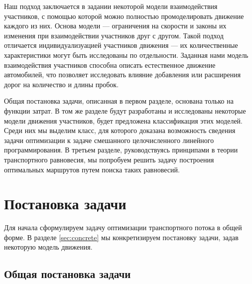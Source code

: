 \documentclass[12pt, a4paper]{article}
\begin{document}
Наш подход заключается в задании некоторой модели взаимодействия участников, с помощью которой можно полностью промоделировать движение каждого из них. Основа модели --- ограничения на скорости и законы их изменения при взаимодействии участников друг с другом. Такой подход отличается индивидуализуацией участников движения --- их количественные характеристики могут быть исследованы по отдельности. Заданная нами модель взаимодействия участников способна описать естественное движение автомобилей, что позволяет исследовать влияние добавления или расширения дорог на количество и длины пробок.

Общая постановка задачи, описанная в первом разделе, основана только на функции затрат.
В том же разделе будут разработаны и исследованы некоторые модели движения участников, будет предложена классификация этих моделей. Среди них мы выделим класс, для которого доказана возможность сведения задачи оптимизации к задаче смешанного целочисленного линейного программирования. В третьем разделе, руководствуясь принципами в теории транспортного равновесия, мы попробуем решить задачу построения оптимальных маршрутов путем поиска таких равновесий.

\newpage
\section{Постановка задачи}

Для начала сформулируем задачу оптимизации транспортного потока в общей форме.
В разделе \ref{sec:concrete} мы конкретизируем постановку задачи, задав некоторую модель движения.

\subsection{Общая постановка задачи}
\end{document}
